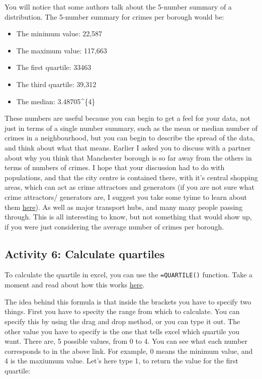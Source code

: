 \documentclass[]{book}
\providecommand{\tightlist}{%
  \setlength{\itemsep}{0pt}\setlength{\parskip}{0pt}}
\theoremstyle{definition}
\theoremstyle{definition}
\theoremstyle{definition}
\theoremstyle{remark}
\begin{document}
You will notice that some authors talk about the 5-number summary of a
distribution. The 5-number summary for crimes per borough would be:

\begin{itemize}
\tightlist
\item
  The minimum value: 22,587
\item
  The maximum value: 117,663
\item
  The first quartile: 33463
\item
  The third quartile: 39,312
\item
  The median: 3.48705\^{}\{4\}
\end{itemize}

These numbers are useful because you can begin to get a feel for your
data, not just in terms of a single number summary, such as the mean or
median number of crimes in a neighbourhood, but you can begin to
describe the spread of the data, and think about what that means.
Earlier I asked you to discuss with a partner about why you think that
Manchester borough is so far away from the others in terms of numbers of
crimes. I hope that your discussion had to do with populations, and that
the city centre is contained there, with it's central shopping areas,
which can act as crime attractors and generators (if you are not sure
what crime attractors/ generators are, I suggest you take some tyime to
learn about them
\href{http://www.popcenter.org/learning/60steps/index.cfm?stepNum=17}{here}).
As well as major transport hubs, and many many people passing through.
This is all interesting to know, but not something that would show up,
if you were just considering the average number of crimes per borough.

\hypertarget{activity-6-calculate-quartiles}{%
\subsection{Activity 6: Calculate
quartiles}\label{activity-6-calculate-quartiles}}

To calculate the quartile in excel, you can use the \texttt{=QUARTILE()}
function. Take a moment and read about how this works
\href{https://support.office.com/en-gb/article/QUARTILE-function-93cf8f62-60cd-4fdb-8a92-8451041e1a2a}{here}.

The idea behind this formula is that inside the brackets you have to
specify two things. First you have to specity the range from which to
calculate. You can specify this by using the drag and drop method, or
you can type it out. The other value you have to specify is the one that
tells excel which quartile you want. There are, 5 possible values, from
0 to 4. You can see what each number corresponds to in the above link.
For example, 0 means the minimum value, and 4 is the maxiumum value.
Let's here type 1, to return the value for the first quartile:
\end{document}

